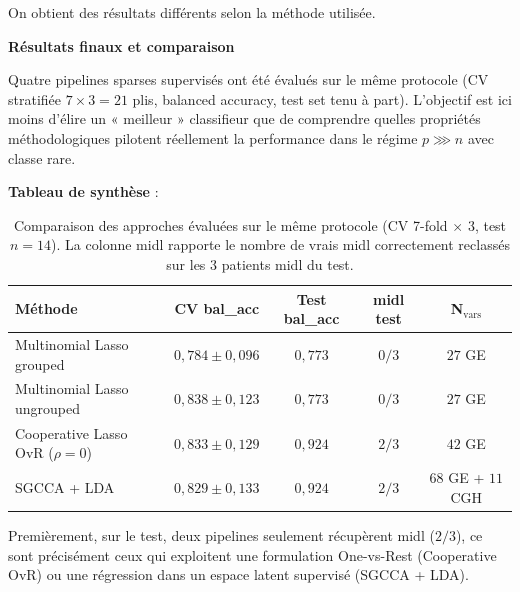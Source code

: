 \documentclass[a4paper,11pt]{paper}
\theoremstyle{plain}
\theoremstyle{definition}
\theoremstyle{remark}
\begin{document}
On obtient des résultats différents selon la méthode utilisée.


\begin{center}
    \Large \textbf{Résultats finaux et comparaison}
\end{center}

Quatre pipelines sparses supervisés ont été évalués sur le même protocole (CV stratifiée $7 \times 3 = 21$ plis, balanced accuracy, test set tenu à part). L'objectif est ici moins d'élire un « meilleur » classifieur que de comprendre quelles propriétés méthodologiques pilotent réellement la performance dans le régime $p \ggg n$ avec classe rare.

\textbf{Tableau de synthèse} :

\begin{table}[h]
    \centering
    \renewcommand{\arraystretch}{1.15}
    \begin{tabular}{l c c c c}
        \toprule
        \textbf{Méthode}                   & \textbf{CV bal\_acc}  & \textbf{Test bal\_acc} & \textbf{midl test} & \textbf{N$_{\text{vars}}$} \\
        \midrule
        Multinomial Lasso grouped          & $0{,}784 \pm 0{,}096$ & $0{,}773$              & $0/3$              & $27$ GE                    \\
        Multinomial Lasso ungrouped        & $0{,}838 \pm 0{,}123$ & $0{,}773$              & $0/3$              & $27$ GE                    \\
        Cooperative Lasso OvR ($\rho = 0$) & $0{,}833 \pm 0{,}129$ & $0{,}924$              & $2/3$              & $42$ GE                    \\
        SGCCA + LDA                        & $0{,}829 \pm 0{,}133$ & $0{,}924$              & $2/3$              & $68$ GE + $11$ CGH         \\
        \bottomrule
    \end{tabular}
    \caption{Comparaison des approches évaluées sur le même protocole
        (CV 7-fold $\times$ 3, test $n=14$). La colonne midl rapporte le nombre
        de vrais midl correctement reclassés sur les $3$ patients midl du test.}
    \label{tab:resultats_finaux}
\end{table}

Premièrement, sur le test, deux pipelines seulement récupèrent midl ($2/3$), ce sont précisément ceux qui exploitent une formulation One-vs-Rest (Cooperative OvR) ou une régression dans un espace latent supervisé (SGCCA + LDA).
\end{document}
